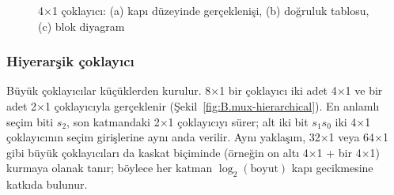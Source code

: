 \begin{figure}[H]
\caption[4×1 çoklayıcı: kapı düzeyi, doğruluk tablosu, blok diyagram]{4×1 çoklayıcı: (a) kapı düzeyinde gerçeklenişi, (b) doğruluk tablosu, (c) blok diyagram}
\label{fig:B.11}
\end{figure}

\subsubsection{Hiyerarşik çoklayıcı}
Büyük çoklayıcılar küçüklerden kurulur. 8×1 bir çoklayıcı iki adet 4×1 ve bir adet 2×1 çoklayıcıyla gerçeklenir (Şekil~\ref{fig:B.mux-hierarchical}). En anlamlı seçim biti $s_2$, son katmandaki 2×1 çoklayıcıyı sürer; alt iki bit $s_1 s_0$ iki 4×1 çoklayıcının seçim girişlerine aynı anda verilir. Aynı yaklaşım, 32×1 veya 64×1 gibi büyük çoklayıcıları da kaskat biçiminde (örneğin on altı 4×1 + bir 4×1) kurmaya olanak tanır; böylece her katman $\log_2(\text{boyut})$ kapı gecikmesine katkıda bulunur.


